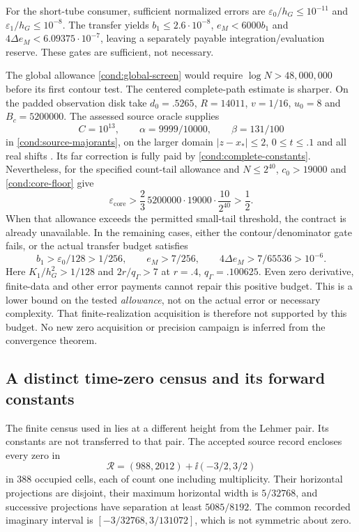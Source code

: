For the short-tube consumer, sufficient normalized errors are
$\varepsilon_0/h_G\le10^{-11}$ and
$\varepsilon_1/h_G\le10^{-8}$. The transfer yields
$b_1\le2.6\cdot10^{-8}$, $e_M<6000b_1$ and
$4\Delta e_M<6.09375\cdot10^{-7}$, leaving a separately payable
integration/evaluation reserve. These gates are sufficient, not necessary.

The global allowance \eqref{cond:global-screen} would require
$\log N>48{,}000{,}000$ before its first contour test. The centered
complete-path estimate is sharper. On the padded observation disk take
$d_0=.5265$, $R=14011$, $v=1/16$, $u_0=8$ and
$B_c=5200000$. The assessed source oracle supplies
\[
 C=10^{13},\qquad \alpha=9999/10000,\qquad\beta=131/100
\]
in \eqref{cond:source-majorants}, on the larger domain
$|z-x_*|\le2$, $0\le t\le.1$ and all real shifts
\cite{BakerGT12,BakerCM51,BakerCMReview42}.
Its far correction is fully paid by \eqref{cond:complete-constants}.
Nevertheless, for the specified count-tail allowance and $N\le2^{40}$,
$c_0>19000$ and \eqref{cond:core-floor} give
\[
 \varepsilon_{\mathrm{core}}
 >\frac23\,5200000\cdot19000\cdot\frac{10}{2^{40}}>\frac12.
\]
When that allowance exceeds the permitted small-tail threshold, the
contract is already unavailable. In the remaining cases, either the
contour/denominator gate fails, or the actual transfer budget satisfies
\[
 b_1>\varepsilon_0/128>1/256,\qquad
 e_M>7/256,\qquad4\Delta e_M>7/65536>10^{-6}.
\]
Here $K_1/h_G^2>1/128$ and $2r/q_\Gamma>7$ at
$r=.4$, $q_\Gamma=.100625$. Even zero derivative, finite-data and
other error payments cannot repair this positive budget. This is a
lower bound on the tested \emph{allowance}, not on the actual error or
necessary complexity. That finite-realization acquisition is therefore
not supported by this budget. No new zero acquisition or precision
campaign is inferred from the convergence theorem.


\subsection{A distinct time-zero census and its forward constants}
\label{fwd:census-example}

The finite census used in \cite{BakerCM34,BakerCMReview30} lies at a
different height from the Lehmer pair. Its constants are not transferred
to that pair. The accepted source record \cite{BakerOCCensus22} encloses
every zero in
\[
 \mathcal R=(988,2012)+\ii(-3/2,3/2)
\]
in 388 occupied cells, each of count one including multiplicity.
Their horizontal projections are disjoint, their maximum horizontal
width is $5/32768$, and successive projections have separation at
least $5085/8192$. The common recorded imaginary interval is
$[-3/32768,3/131072]$, which is not symmetric about zero.

